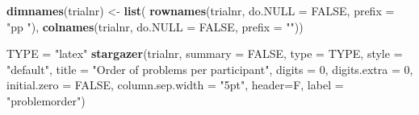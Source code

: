 \documentclass[11pt,,]{article}
\newenvironment{Shaded}{\begin{snugshade}}{\end{snugshade}}
\newcommand{\KeywordTok}[1]{\textcolor[rgb]{0.13,0.29,0.53}{\textbf{{#1}}}}
\newcommand{\DataTypeTok}[1]{\textcolor[rgb]{0.13,0.29,0.53}{{#1}}}
\newcommand{\DecValTok}[1]{\textcolor[rgb]{0.00,0.00,0.81}{{#1}}}
\newcommand{\StringTok}[1]{\textcolor[rgb]{0.31,0.60,0.02}{{#1}}}
\newcommand{\OtherTok}[1]{\textcolor[rgb]{0.56,0.35,0.01}{{#1}}}
\newcommand{\NormalTok}[1]{{#1}}
\begin{document}
\begin{Shaded}
\begin{Highlighting}[]
\KeywordTok{dimnames}\NormalTok{(trialnr) <-}\StringTok{ }\KeywordTok{list}\NormalTok{(}
  \KeywordTok{rownames}\NormalTok{(trialnr, }\DataTypeTok{do.NULL =} \OtherTok{FALSE}\NormalTok{, }\DataTypeTok{prefix =} \StringTok{"pp "}\NormalTok{),}
  \KeywordTok{colnames}\NormalTok{(trialnr, }\DataTypeTok{do.NULL =} \OtherTok{FALSE}\NormalTok{, }\DataTypeTok{prefix =} \StringTok{""}\NormalTok{))}

\NormalTok{TYPE =}\StringTok{ "latex"}
\KeywordTok{stargazer}\NormalTok{(trialnr, }
          \DataTypeTok{summary =} \OtherTok{FALSE}\NormalTok{,}
          \DataTypeTok{type =} \NormalTok{TYPE, }\DataTypeTok{style =} \StringTok{"default"}\NormalTok{,}
          \DataTypeTok{title =} \StringTok{"Order of problems per participant"}\NormalTok{,}
          \DataTypeTok{digits =} \DecValTok{0}\NormalTok{, }\DataTypeTok{digits.extra =} \DecValTok{0}\NormalTok{, }\DataTypeTok{initial.zero =} \OtherTok{FALSE}\NormalTok{,}
          \DataTypeTok{column.sep.width =} \StringTok{"5pt"}\NormalTok{, }\DataTypeTok{header=}\NormalTok{F,}
          \DataTypeTok{label =} \StringTok{"problemorder"}\NormalTok{)}
\end{Highlighting}
\end{Shaded}
\end{document}
